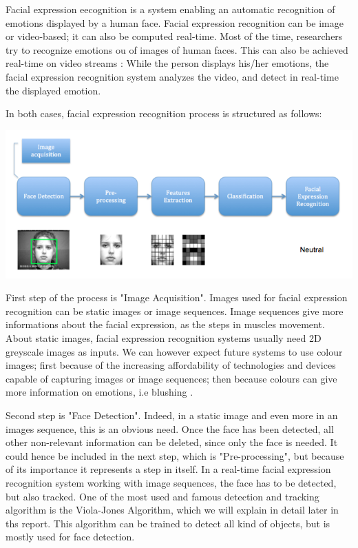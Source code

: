 \noindent Facial expression eecognition is a system enabling an automatic recognition of emotions displayed by a human face. Facial expression recognition can be image or video-based; it can also be computed real-time. Most of the time, researchers try to recognize emotions ou of images of human faces. This can also be achieved real-time on video streams : While the person displays his/her emotions, the facial expression recognition system analyzes the video, and detect in real-time the displayed emotion.
\newline

\noindent In both cases, facial expression recognition process is structured as follows:


\noindent \includegraphics[scale=0.6]{figures/facial_expression_recognition_process}

\noindent First step of the process is "Image Acquisition". Images used for facial expression recognition can be static images or image sequences. Image sequences give more informations about the facial expression, as the steps in muscles movement. About static images, facial expression recognition systems usually need 2D greyscale images as inputs. We can however expect future systems to use colour images; first because of the increasing affordability of technologies and devices capable of capturing images or image sequences; then because colours can give more information on emotions, i.e blushing \cite{CHI03}.
\newline

\noindent Second step is "Face Detection". Indeed, in a static image and even more in an images sequence, this is an obvious need. Once the face has been detected, all other non-relevant information can be deleted, since only the face is needed. It could hence be included in the next step, which is "Pre-processing", but because of its importance it represents a step in itself. In a real-time facial expression recognition system working with image sequences, the face has to be detected, but also tracked. One of the most used and famous detection and tracking algorithm is the Viola-Jones Algorithm, which we will explain in detail later in ths report. This algorithm can be trained to detect all kind of objects, but is mostly used for face detection. 
\newline

